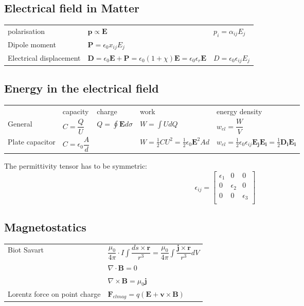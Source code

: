	\renewcommand{\arraystretch}{1.2}

	\subsection{Electrical field in Matter}
		\begin{tabularx}{\columnwidth}{lXX}
			polarisation & $\mathbf{p} \propto \mathbf{E}$ & $p_i = \alpha_{ij}E_j$\\
			Dipole moment & $\mathbf{P} = \epsilon_0 x_{ij} E_j$ &\\
			Electrical displacement & $\mathbf{D} = \epsilon_0\mathbf{E} + \mathbf{P} = \epsilon_0 (1+\chi)\mathbf{E} = \epsilon_0\epsilon_r\mathbf{E}$&
			$D = \epsilon_0\epsilon_{ij}E_j$\\
			
		\end{tabularx}

	\subsection{Energy in the electrical field}
	\begin{tabularx}{\columnwidth}{lllXX}
		&capacity & charge & work&energy density\\
		General & $C = \dfrac{Q}{U}$ & $Q = \oint\mathbf{E}d\sigma$ & $W = \int U dQ$& $w_{el} = \dfrac{W}{V}$\\
		Plate capacitor & $C = \epsilon_0\dfrac{A}{d}$ & &$W = \frac{1}{2}CU^2 = \frac{1}{2}\epsilon_0 \mathbf{E}^2A d $ & $w_{el}= \frac{1}{2}\epsilon_0\epsilon_{ij}\mathbf{E_j E_i}= \frac{1}{2}\mathbf{D_i E_i}$\\

		
	\end{tabularx}
	
		The permittivity tensor has to be symmetric: 
		$$
		\epsilon_{ij} = \begin{bmatrix}
		\epsilon_1 & 0 & 0 \\ 0 & \epsilon_2 & 0 \\ 0 & 0 & \epsilon_3 \\
		\end{bmatrix}
		$$ 

		\subsection{Magnetostatics}
		
		\begin{tabularx}{\columnwidth}{p{3cm}X}
			
		Biot Savart & $\dfrac{\mu_0}{4\pi}\cdot I \int \dfrac{ds\times \mathbf{r}}{r^3} = \dfrac{\mu_0}{4\pi} \int \dfrac{\mathbf{j}\times \mathbf{r}}{r^3}dV$ \\
					& $\nabla\cdot \mathbf{B} = 0$\\
					& $\nabla\times \mathbf{B} = \mu_0 \mathbf{j}$\\
		Lorentz force on point charge & $\mathbf{F}_{elmag} = q(\mathbf{E+v\times B})	$
 		\end{tabularx}
		
